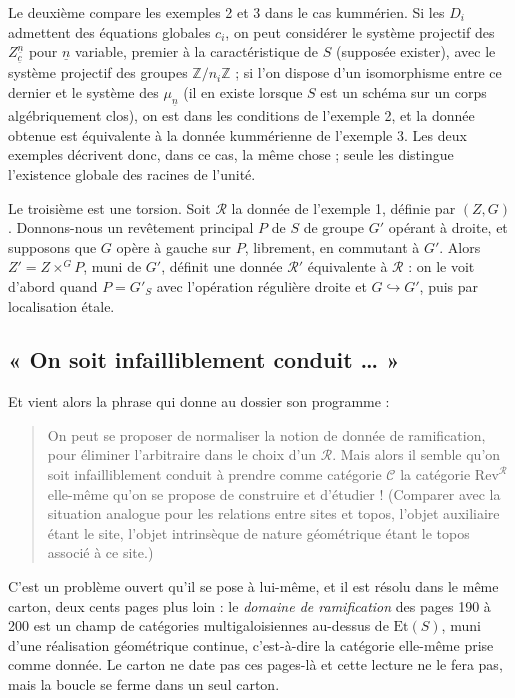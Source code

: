\documentclass[11pt,a4paper]{article}
\begin{document}
Le deuxième compare les exemples 2 et 3 dans le cas kummérien. Si les $D_{i}$
admettent des équations globales $c_{i}$, on peut considérer le système
projectif des $Z^{\underline{n}}_{\underline{c}}$ pour $\underline{n}$
variable, premier à la caractéristique de $S$ (supposée exister), avec le
système projectif des groupes $\mathbb{Z}/n_{i}\mathbb{Z}$ ; si l'on dispose
d'un isomorphisme entre ce dernier et le système des $\mu_{\underline{n}}$
(il en existe lorsque $S$ est un schéma sur un corps algébriquement clos), on
est dans les conditions de l'exemple 2, et la donnée obtenue est équivalente à
la donnée kummérienne de l'exemple 3. Les deux exemples décrivent donc, dans ce
cas, la même chose ; seule les distingue l'existence globale des racines
de l'unité.

Le troisième est une torsion. Soit $\mathcal{R}$ la donnée de l'exemple 1,
définie par $(Z,G)$. Donnons-nous un revêtement principal $P$ de $S$ de groupe
$G'$ opérant à droite, et supposons que $G$ opère à gauche sur $P$, librement,
en commutant à $G'$. Alors $Z' = Z \times^{G} P$, muni de $G'$, définit une
donnée $\mathcal{R}'$ équivalente à $\mathcal{R}$ : on le voit d'abord quand
$P = G'_{S}$ avec l'opération régulière droite et $G \hookrightarrow G'$, puis
par localisation étale.

\subsection*{« On soit infailliblement conduit … »}

Et vient alors la phrase qui donne au dossier son programme :

\begin{quote}
On peut se proposer de normaliser la notion de donnée de ramification, pour
éliminer l'arbitraire dans le choix d'un $\mathcal{R}$. Mais alors il semble
qu'on soit infailliblement conduit à prendre comme catégorie $\mathcal{C}$ la
catégorie $\mathrm{Rev}^{\mathcal{R}}$ elle-même qu'on se propose de construire
et d'étudier ! (Comparer avec la situation analogue pour les relations entre
sites et topos, l'objet auxiliaire étant le site, l'objet intrinsèque de nature
géométrique étant le topos associé à ce site.)
\end{quote}

C'est un problème ouvert qu'il se pose à lui-même, et il est résolu
dans le même carton, deux cents pages plus loin : le \emph{domaine de
ramification} des pages 190 à 200 est un champ de catégories multigaloisiennes
au-dessus de $\mathrm{Et}(S)$, muni d'une réalisation géométrique continue,
c'est-à-dire la catégorie elle-même prise comme donnée. Le carton ne
date pas ces pages-là et cette lecture ne le fera pas, mais la boucle se
ferme dans un seul carton.
\end{document}
